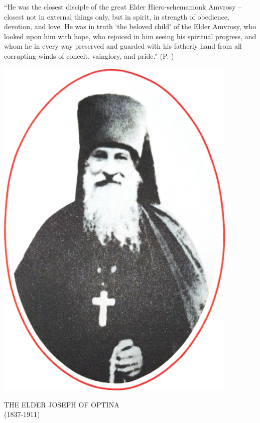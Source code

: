 \vspace*{\fill}
\minicross
\vspace{1cm}
\begin{adjustwidth}{1.25cm}{1.25cm}
``He was the closest disciple of the great Elder Hiero-schemamonk Amvrosy -- closest not in external things only, but in spirit, in strength of obedience, devotion, and love. He was in truth `the beloved child' of the Elder Amvrosy, who looked upon him with hope, who rejoiced in him seeing his spiritual progress, and whom he in every way preserved and guarded with his fatherly hand from all corrupting winds of conceit, vainglory, and pride.'' (P. \pageref{intro-excerpt})
\end{adjustwidth}
\vspace{1cm}
\minicross
\vspace*{\fill}
\newpage
\vspace*{\fill}
\begin{center}
\includegraphics[height=17cm]{./Images/Elder_Joseph_Portrait.png}

\vspace*{\fill}
THE ELDER JOSEPH OF OPTINA\\
(1837-1911)
\end{center}
\vspace*{\fill}
